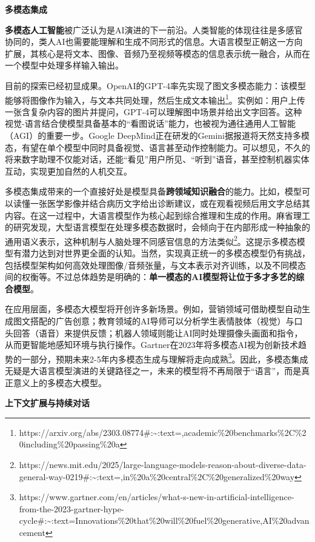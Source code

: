 \documentclass[
  letterpaper,
]{scrbook}
\begin{document}
\textbf{多模态集成}

\textbf{多模态人工智能}被广泛认为是AI演进的下一前沿。人类智能的体现往往是多感官协同的，类人AI也需要能理解和生成不同形式的信息。大语言模型正朝这一方向扩展，其核心是将文本、图像、音频乃至视频等模态的信息表示统一融合，从而在一个模型中处理多样输入输出。

目前的探索已经初显成果。OpenAI的GPT-4率先实现了图文多模态能力：该模型能够将图像作为输入，与文本共同处理，然后生成文本输出\footnote{https://arxiv.org/abs/2303.08774\#:\textasciitilde:text=,academic\%20benchmarks\%2C\%20including\%20passing\%20a}。实例如：用户上传一张含复杂内容的图片并提问，GPT-4可以理解图中场景并给出文字回答。这种视觉-语言结合使模型具备基本的``看图说话''能力，也被视为通往通用人工智能（AGI）的重要一步。Google
DeepMind正在研发的Gemini据报道将天然支持多模态，有望在单个模型中同时具备视觉、语言甚至动作控制能力。可以想见，不久的将来数字助理不仅能对话，还能``看见''用户所见、``听到''语音，甚至控制机器实体互动，实现更加自然的人机交互。

多模态集成带来的一个直接好处是模型具备\textbf{跨领域知识融合}的能力。比如，模型可以读懂一张医学影像并结合病历文字给出诊断建议，或在观看视频后用文字总结其内容。在这一过程中，大语言模型作为核心起到综合推理和生成的作用。麻省理工的研究发现，大型语言模型在处理多模态数据时，会倾向于在内部形成一种抽象的通用语义表示，这种机制与人脑处理不同感官信息的方法类似\footnote{https://news.mit.edu/2025/large-language-models-reason-about-diverse-data-general-way-0219\#:\textasciitilde:text=,in\%20a\%20central\%2C\%20generalized\%20way}。这提示多模态模型有潜力达到对世界更全面的认知。当然，实现真正统一的多模态模型仍有挑战，包括模型架构如何高效处理图像/音频张量，与文本表示对齐训练，以及不同模态间的权衡等。不过总体趋势是明确的：\textbf{单一模态的AI模型将让位于多才多艺的综合模型}。

在应用层面，多模态大模型将开创许多新场景。例如，营销领域可借助模型自动生成图文搭配的广告创意；教育领域的AI导师可以分析学生表情肢体（视觉）与口头回答（语音）来提供反馈；机器人领域则能让AI同时处理摄像头画面和指令，从而更智能地感知环境与执行操作。Gartner在2023年将多模态AI视为创新技术趋势的一部分，预期未来2-5年内多模态生成与理解将走向成熟\footnote{https://www.gartner.com/en/articles/what-s-new-in-artificial-intelligence-from-the-2023-gartner-hype-cycle\#:\textasciitilde:text=Innovations\%20that\%20will\%20fuel\%20generative,AI\%20advancement}。因此，多模态集成无疑是大语言模型演进的关键路径之一，未来的模型将不再局限于``语言''，而是真正意义上的多模态大模型。

\textbf{上下文扩展与持续对话}
\end{document}
